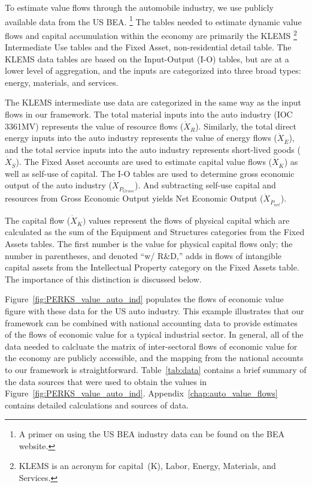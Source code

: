 To estimate value flows through the automobile industry, 
we use publicly available data from the 
US BEA.%
	\footnote{
	A primer on using the US BEA
	industry data can be found 
	on the BEA website.\cite{Streitwieser:2011aa}
	}
The tables needed to estimate dynamic 
value flows and capital accumulation within the economy 
are primarily the KLEMS%
	\footnote{
	KLEMS is an acronym for 
	capital~(K), Labor, Energy, Materials, and Services.
	} 
Intermediate Use
tables and 
the Fixed Asset, non-residential detail table. 
The KLEMS data tables
are based on the Input-Output (I-O) tables, 
but are at a lower level of aggregation,
and the inputs are categorized 
into three broad types: energy, materials, and services.

The KLEMS intermediate use data are categorized in the same
way as the input flows in our framework. 
The total material inputs into the auto industry (IOC 3361MV) 
represents the value of resource flows ($\dot{X}_{\dot{R}}$). 
Similarly, the total direct energy inputs into the 
auto industry represents the value of energy flows ($\dot{X}_{\dot{E}}$),
and the total service inputs into the auto industry represents 
short-lived goods ($\dot{X}_{\dot{S}}$).
The Fixed Asset accounts are
used to estimate capital value flows 
($\dot{X}_{\dot{K}}$) as well as self-use of capital.  
The I-O tables are used to determine gross economic output of the 
auto industry ($\dot{X}_{\dot{P}_{Gross}}$). And subtracting self-use capital and resources
from Gross Economic Output yields Net Economic Output ($\dot{X}_{\dot{P}_{net}}$).

The capital flow ($\dot{X}_{\dot{K}})$
values represent the flows of physical
capital which are calculated as the sum of the Equipment and Structures
categories from the Fixed Assets tables. The first number is the
value for physical capital flows only; the number in
parentheses, and denoted
``w/  R\&D,''  adds in flows of intangible capital
assets from the  Intellectual Property category
on the Fixed Assets table. The importance
of this distinction is discussed below.



Figure~\ref{fig:PERKS_value_auto_ind} populates
the flows of economic value figure with these data
for the US auto industry.
This example illustrates 
that our framework can be combined with national accounting data
to provide estimates of the flows of economic value for
a typical industrial sector.  In general,
all of the data needed to calcluate the matrix of
inter-sectoral flows
of economic value for the economy
are publicly accessible, and 
the mapping from the national accounts 
to our framework is straightforward.
Table~\ref{tab:data} contains a brief summary  
of the data sources that were used 
to obtain the values in Figure~\ref{fig:PERKS_value_auto_ind}. 
Appendix~\ref{chap:auto_value_flows} contains
detailed calculations and sources of data.

